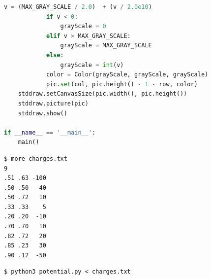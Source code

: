 \documentclass[8pt,a4paper,compress]{beamer}
\begin{document}
\begin{frame}[fragile]
\pause

\begin{lstlisting}[language=Python,style=focusin]
            v = (MAX_GRAY_SCALE / 2.0)  + (v / 2.0e10)
            if v < 0:
                grayScale = 0
            elif v > MAX_GRAY_SCALE:
                grayScale = MAX_GRAY_SCALE
            else:
                grayScale = int(v)            
            color = Color(grayScale, grayScale, grayScale)
            pic.set(col, pic.height() - 1 - row, color)
    stddraw.setCanvasSize(pic.width(), pic.height())
    stddraw.picture(pic)
    stddraw.show()

if __name__ == '__main__':
    main()
\end{lstlisting}

\begin{minipage}{150pt}
\pause

\begin{lstlisting}[language={},style=focusin]
$ more charges.txt
9
.51 .63 -100
.50 .50   40
.50 .72   10
.33 .33    5
.20 .20  -10
.70 .70   10
.82 .72   20
.85 .23   30
.90 .12  -50
\end{lstlisting}

\pause
\smallskip

\begin{lstlisting}[language={},style=focusin]
$ python3 potential.py < charges.txt
\end{lstlisting}
\end{minipage}%
\hfill
\begin{minipage}{150pt}
\begin{center}
\end{center}
\end{minipage}
\end{frame}
\end{document}
